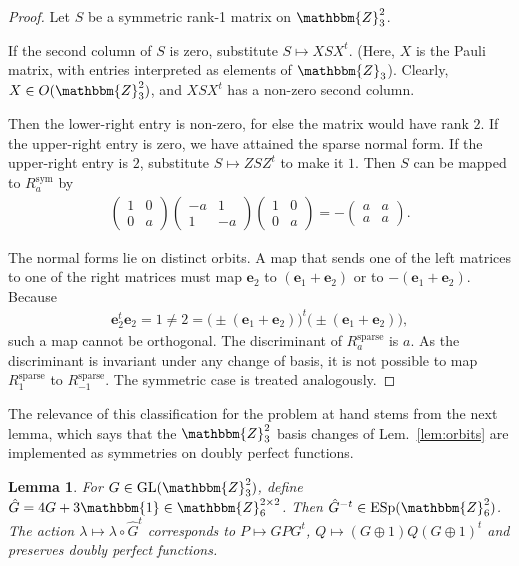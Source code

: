 \documentclass[aps,nofootinbib,floatfix,a4paper]{revtex4}
\newtheorem{lemma}[theorem]{Lemma}
\newcommand{\sym}{^\mathrm{sym}}
\newcommand{\sparse}{^\mathrm{sparse}}
\newcommand{\1}{\mbox{$\mathbf{1}$}}
\def\ZZ{\mathbbm{Z}}
\def\Id{\mathbbm{1}}
\DeclareMathOperator{\ESp}{ESp}
\DeclareMathOperator{\GL}{GL}
\renewcommand{\vec}{\mathbf}
\begin{document}
\begin{proof}
	Let $S$ be a symmetric rank-1 matrix on $\ZZ_3^2$.

	If the second column of $S$ is zero, substitute $S \mapsto X S X^t$.
	(Here, $X$ is the Pauli matrix, with entries interpreted as elements of $\ZZ_3$).
	Clearly, $X\in O(\ZZ_3^2)$, and $XSX^t$ has a non-zero second column.

	Then the lower-right entry is non-zero, for else the matrix would have rank $2$.
	If the upper-right entry is zero, we have attained the sparse normal form.
	If the upper-right entry is $2$, substitute $S \mapsto ZSZ^t$ to make it $1$.
	Then $S$ can be mapped to $R\sym_a$ by
	\begin{align*}
		\begin{pmatrix}
			1 & 0 \\
			0 & a
		\end{pmatrix}
		\begin{pmatrix}
			-a & 1 \\
			1 & -a
		\end{pmatrix}
		\begin{pmatrix}
			1 & 0 \\
			0 & a
		\end{pmatrix}
		=
		-
		\begin{pmatrix}
			a & a \\
			a & a
		\end{pmatrix}.
	\end{align*}

	The normal forms lie on distinct orbits.
	A map that sends one of the left matrices to one of the right matrices must map 
	$\vec e_2$ to 
	$ (\vec e_1+\vec e_2)$
	or to
	$-(\vec e_1+\vec e_2)$.
	Because
	\begin{align*}
		\vec e_2^t \vec e_2
		=
		1
		\neq
		2
		=
		\big(\pm (\vec e_1+\vec e_2)\big)^t
		\big(\pm (\vec e_1+\vec e_2)\big),
	\end{align*}
	such a map cannot be orthogonal.
	The discriminant of $R\sparse_a$ is $a$.
	As the discriminant is invariant under any change of basis, it is not possible to  map $R\sparse_1$ to $R\sparse_{-1}$.
	The symmetric case is treated analogously.
\end{proof}

The relevance of this classification for the problem at hand stems from the next lemma, which says that the $\ZZ_3^2$ basis changes of Lem.~\ref{lem:orbits} are implemented as symmetries on doubly perfect functions.

\begin{lemma}\label{lem:relating_symmetries}
	For $G\in\GL(\ZZ_3^2)$, define
	$\hat G = 4 G + 3\Id \in\ZZ_6^{2\times 2}$.
	Then $\hat G^{-t} \in \ESp(\ZZ_6^2)$. 
	The action 
	$\lambda\mapsto \lambda \circ \hat G^t$
	corresponds to 
	$P \mapsto GPG^t$, $Q\mapsto (G\oplus 1)Q(G\oplus 1)^t$ 
	and preserves doubly perfect functions.
\end{lemma}
\end{document}
